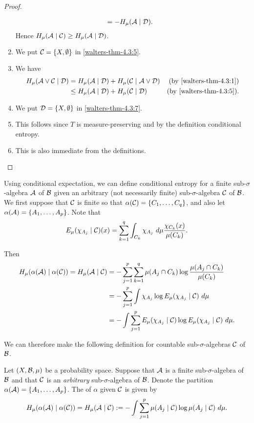 \begin{theorem}
\begin{proof}
\begin{enumerate}
\begin{align*}
						&= -H_\mu(\mathcal{A} \mid \mathcal{D}).
				\end{align*}
				Hence $H_\mu(\mathcal{A} \mid \mathcal{C}) \geq H_\mu(\mathcal{A} \mid \mathcal{D})$.
			\item We put $\mathcal{C} = \{X, \emptyset\}$ in \ref{walters-thm-4.3:5}.
			\item We have
				\begin{align*}
					H_\mu(\mathcal{A} \vee \mathcal{C} \mid \mathcal{D}) &= H_\mu(\mathcal{A} \mid \mathcal{D}) + H_\mu(\mathcal{C} \mid \mathcal{A} \vee \mathcal{D}) & \text{(by \ref{walters-thm-4.3:1})} \\
						&\leq H_\mu(\mathcal{A} \mid \mathcal{D}) + H_\mu(\mathcal{C} \mid \mathcal{D}) & \text{(by \ref{walters-thm-4.3:5})}.
				\end{align*}
			\item We put $\mathcal{D} = \{X, \emptyset\}$ in \ref{walters-thm-4.3:7}.
			\item This follows since $T$ is measure-preserving and by the definition conditional entropy.
			\item This is also immediate from the definitions.
		\end{enumerate}
	\end{proof}
\end{theorem}

Using conditional expectation, we can define conditional entropy for a finite sub-$\sigma$-algebra $\mathcal{A}$ of $\mathcal{B}$ given an arbitrary (not necessarily finite) sub-$\sigma$-algebra $\mathcal{C}$ of $\mathcal{B}$. We first suppose that $\mathcal{C}$ is finite so that $\alpha(\mathcal{C}) = \{C_1, \dots, C_q\}$, and also let $\alpha(\mathcal{A}) = \{A_1, \dots, A_p\}$. Note that
\[
		E_\mu(\chi_{A_j} \mid \C)(x) = \sum_{k = 1}^{q}{\int_{C_k}{\chi_{A_j}\ d\mu}\frac{\chi_{C_k}(x)}{\mu(C_k)}}.
\]

Then
\begin{align*}
	H_\mu(\alpha(\mathcal{A}) \mid \alpha(\mathcal{C})) = H_\mu(\mathcal{A} \mid \mathcal{C}) &= -\sum_{j = 1}^{p}{\sum_{k = 1}^{q}{\mu(A_j \cap C_k) \log{\frac{\mu(A_j \cap C_k)}{\mu(C_k)}}}} \\
		&= -\sum_{j = 1}^{p}{\int{\chi_{A_j} \log{E_\mu(\chi_{A_j} \mid \mathcal{C})}\ d\mu}} \\
		&= -\int{\sum_{j = 1}^{p}{E_\mu(\chi_{A_j} \mid \mathcal{C}) \log{E_\mu(\chi_{A_j} \mid \mathcal{C})}}\ d\mu}.
\end{align*}

We can therefore make the following definition for countable sub-$\sigma$-algebras $\mathcal{C}$ of $\mathcal{B}$.

\begin{definition}
	Let $(X, \mathcal{B}, \mu)$ be a probability space. Suppose that $\mathcal{A}$ is a finite sub-$\sigma$-algebra of $\mathcal{B}$ and that $\mathcal{C}$ is an \emph{arbitrary} sub-$\sigma$-algebra of $\mathcal{B}$. Denote the partition $\alpha(\mathcal{A}) = \{A_1, \dots, A_p\}$. The  of $\alpha$ given $\mathcal{C}$ is given by
	\[
		H_\mu(\alpha(\A) \mid \alpha(\C)) = H_\mu(\A \mid \C) := -\int{\sum_{j = 1}^{p}{\mu(A_j \mid \C) \log{\mu(A_j \mid \C)}}\ d\mu}.
	\]
\end{definition}

